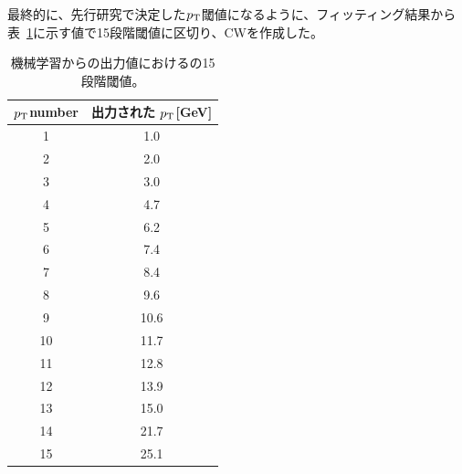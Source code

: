 最終的に、先行研究\cite{article:shiomi-mron}で決定した$p_{\rm{T}}$閾値になるように、フィッティング結果から表~\ref{Effective_number}に示す値で15段階閾値に区切り、CWを作成した。
\begin{table}[thb]
\centering
    \caption{機械学習からの出力値におけるの15段階閾値。}
    \label{Effective_number}
    \begin{tabular}{|c|c|}
        \hline
        $p_{\rm{T}}$number & 出力された $p_{\rm{T}}$[GeV]\\
        \hline
        1 & 1.0\\
        \hline
        2 & 2.0\\
        \hline
        3 & 3.0\\
        \hline
        4 & 4.7\\
        \hline
        5 & 6.2\\
        \hline
        6 & 7.4\\
        \hline
        7 & 8.4\\
        \hline
        8 & 9.6\\
        \hline
        9 & 10.6\\
        \hline
        10 & 11.7\\
        \hline
        11 & 12.8\\
        \hline
        12 & 13.9\\
        \hline
        13 & 15.0\\
        \hline
        14 & 21.7\\
        \hline
        15 & 25.1\\
        \hline
        
    \end{tabular}
\end{table}





